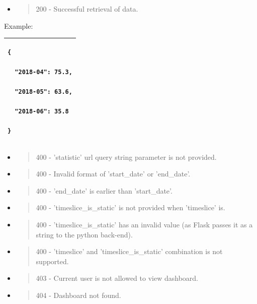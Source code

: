 \begin{itemize}
\item
  \begin{quote}
  200 - Successful retrieval of data.
  \end{quote}
\end{itemize}

Example:

\begin{longtable}[]{@{}l@{}}
\toprule
\endhead
\begin{minipage}[t]{0.97\columnwidth}\raggedright
\begin{lstlisting}
{

  "2018-04": 75.3,

  "2018-05": 63.6,

  "2018-06": 35.8

}
\end{lstlisting}\strut
\end{minipage}\tabularnewline
\bottomrule
\end{longtable}

\begin{itemize}
\item
  \begin{quote}
  400 - 'statistic' url query string parameter is not provided.
  \end{quote}
\item
  \begin{quote}
  400 - Invalid format of 'start\_date' or 'end\_date'.
  \end{quote}
\item
  \begin{quote}
  400 - 'end\_date' is earlier than 'start\_date'.
  \end{quote}
\item
  \begin{quote}
  400 - 'timeslice\_is\_static' is not provided when 'timeslice' is.
  \end{quote}
\item
  \begin{quote}
  400 - 'timeslice\_is\_static' has an invalid value (as Flask passes it
  as a string to the python back-end).
  \end{quote}
\item
  \begin{quote}
  400 - 'timeslice' and 'timeslice\_is\_static' combination is not
  supported.
  \end{quote}
\item
  \begin{quote}
  403 - Current user is not allowed to view dashboard.
  \end{quote}
\item
  \begin{quote}
  404 - Dashboard not found.
  \end{quote}
\end{itemize}

